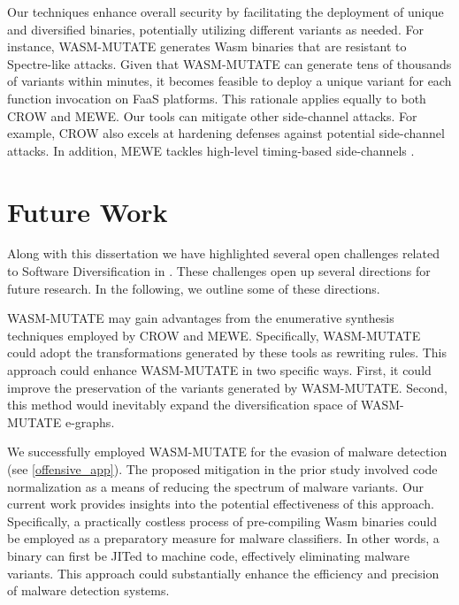 \begin{strategy}
    Our techniques enhance overall security by facilitating the deployment of unique and diversified \Wasm binaries, potentially utilizing different variants as needed. 
    For instance, WASM-MUTATE generates Wasm binaries that are resistant to Spectre-like attacks. 
    Given that WASM-MUTATE can generate tens of thousands of variants within minutes, it becomes feasible to deploy a unique variant for each function invocation on FaaS platforms. 
    This rationale applies equally to both CROW and MEWE. 
    Our tools can mitigate other side-channel attacks. 
    For example, CROW also excels at hardening defenses against potential side-channel attacks. 
    In addition, MEWE tackles high-level timing-based side-channels \cite{morgan2015web}.
\end{strategy}


\section{Future Work}

Along with this dissertation we have highlighted several open challenges related to Software Diversification in \Wasm.
These challenges open up several directions for future research.
In the following, we outline some of these directions.

\begin{strategy}
WASM-MUTATE may gain advantages from the enumerative synthesis techniques employed by CROW and MEWE. 
Specifically, WASM-MUTATE could adopt the transformations generated by these tools as rewriting rules. 
This approach could enhance WASM-MUTATE in two specific ways. 
First, it could improve the preservation of the variants generated by WASM-MUTATE. 
Second, this method would inevitably expand the diversification space of WASM-MUTATE e-graphs.
\end{strategy}


\begin{strategy}
     We successfully employed WASM-MUTATE for the evasion of malware detection (see \autoref{offensive_app}). 
    The proposed mitigation in the prior study involved code normalization as a means of reducing the spectrum of malware variants. 
    Our current work provides insights into the potential effectiveness of this approach. 
    Specifically, a practically costless process of pre-compiling Wasm binaries could be employed as a preparatory measure for malware classifiers. 
    In other words, a \wasm binary can first be JITed to machine code, effectively eliminating malware variants. 
    This approach could substantially enhance the efficiency and precision of malware detection systems.
\end{strategy}

